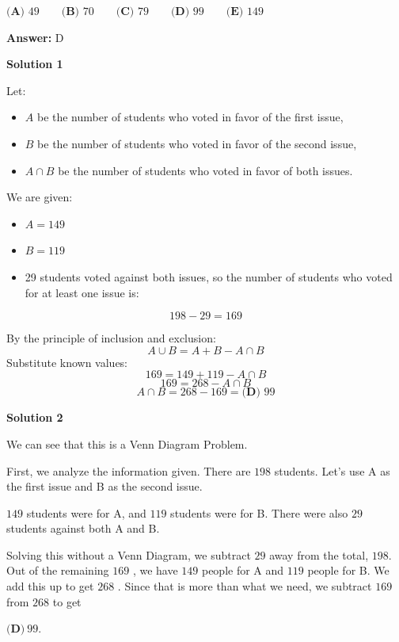 \begin{enumerate}
 $\textbf{(A) }49\qquad\textbf{(B) }70\qquad\textbf{(C) }79\qquad\textbf{(D) }99\qquad \textbf{(E) }149$

 \textbf{Answer: }D



\textbf{Solution 1}

Let:

 
            \begin{itemize}
        \item $A$ be the number of students who voted in favor of the first issue,
        \item $B$ be the number of students who voted in favor of the second issue,
        \item $A \cap B$ be the number of students who voted in favor of both issues.
            \end{itemize}
            We are given:

 
            \begin{itemize}
        \item $A = 149$
        \item $B = 119$
        \item 29 students voted against both issues, so the number of students who voted for at least one issue is:
            \end{itemize}
            
 \[198 - 29 = 169\]

 By the principle of inclusion and exclusion:
 \[A \cup B = A + B - A \cap B\]Substitute known values:
 \[169 = 149 + 119 - A \cap B\]
 \[169 = 268 - A \cap B\]
 \[A \cap B = 268 - 169 = \boxed{\textbf{(D) }99}\]




\textbf{Solution 2}

We can see that this is a Venn Diagram Problem.

 First, we analyze the information given. There are $198$ students. Let's use A as the first issue and B as the second issue. 

 $149$ students were for A, and $119$ students were for B. There were also $29$ students against both A and B. 

 Solving this without a Venn Diagram, we subtract $29$ away from the total, $198$. Out of the remaining $169$ , we have $149$ people for A and $119$ people for B. We add this up to get $268$ . Since that is more than what we need, we subtract $169$ from $268$ to get 

 $\boxed{\textbf{(D)}~99}$.


\end{enumerate}
